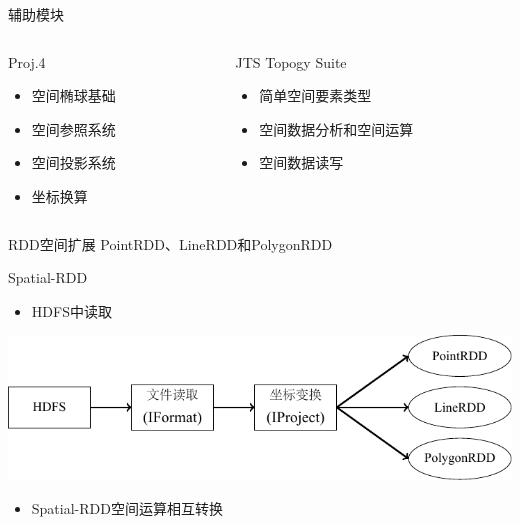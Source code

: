 \begin{frame}[t]{辅助模块}
    \begin{columns}
        \begin{column}{0.4 \textwidth}

            \begin{center}
            \alert{Proj.4}

            \begin{itemize}
                \item 空间椭球基础
                \item 空间参照系统
                \item 空间投影系统
                \item 坐标换算
            \end{itemize}
            \end{center}
            
        \end{column}
        \pause
        \begin{column}{0.6 \textwidth}

            \begin{center}
             \alert{JTS Topogy Suite}

                \begin{itemize}
                \item 简单空间要素类型
                \item 空间数据分析和空间运算
                \item 空间数据读写
                \end{itemize}
            \end{center}
           
        \end{column}
    \end{columns}
\end{frame}

\begin{frame}[c]{RDD空间扩展}
    PointRDD、LineRDD和PolygonRDD

    Spatial-RDD
    \pause
    \begin{itemize}
        \item HDFS中读取
    \end{itemize}
    \includegraphics[scale=0.8]{figures/spatialRDD.pdf}

    \pause
    \begin{itemize}
        \item Spatial-RDD空间运算相互转换
    \end{itemize}
\end{frame}

